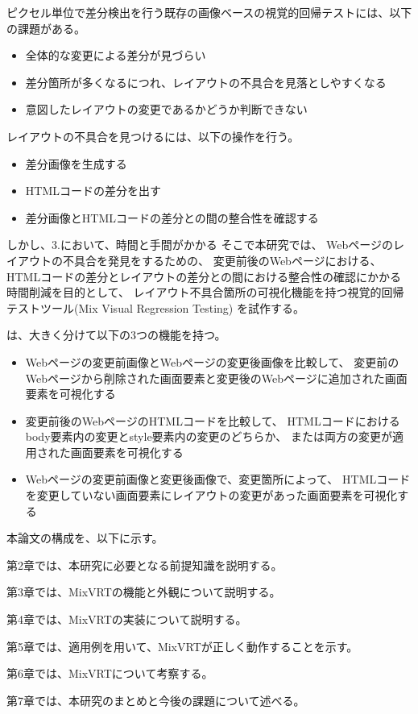 ピクセル単位で差分検出を行う既存の画像ベースの視覚的回帰テストには、以下の課題がある。
\begin{itemize}
    \item 全体的な変更による差分が見づらい
    \item 差分箇所が多くなるにつれ、レイアウトの不具合を見落としやすくなる
    \item 意図したレイアウトの変更であるかどうか判断できない
\end{itemize}

レイアウトの不具合を見つけるには、以下の操作を行う。
\begin{itemize}
    \item 差分画像を生成する
    \item HTMLコードの差分を出す
    \item 差分画像とHTMLコードの差分との間の整合性を確認する
\end{itemize}
しかし、3.において、時間と手間がかかる
そこで本研究では、
Webページのレイアウトの不具合を発見をするための、
変更前後のWebページにおける、
HTMLコードの差分とレイアウトの差分との間における整合性の確認にかかる時間削減を目的として、
レイアウト不具合箇所の可視化機能を持つ視覚的回帰テストツール\toolName(Mix Visual Regression Testing) を試作する。
\par
\toolName は、大きく分けて以下の3つの機能を持つ。
\begin{itemize}
    \item  Webページの変更前画像とWebページの変更後画像を比較して、
          変更前のWebページから削除された画面要素と変更後のWebページに追加された画面要素を可視化する
    \item 変更前後のWebページのHTMLコードを比較して、
          HTMLコードにおけるbody要素内の変更とstyle要素内の変更のどちらか、
          または両方の変更が適用された画面要素を可視化する
    \item Webページの変更前画像と変更後画像で、変更箇所によって、
          HTMLコードを変更していない画面要素にレイアウトの変更があった画面要素を可視化する
\end{itemize}
\par
本論文の構成を、以下に示す。\par
第2章では、本研究に必要となる前提知識を説明する。\par
第3章では、MixVRTの機能と外観について説明する。\par
第4章では、MixVRTの実装について説明する。\par
第5章では、適用例を用いて、MixVRTが正しく動作することを示す。\par
第6章では、MixVRTについて考察する。\par
第7章では、本研究のまとめと今後の課題について述べる。




